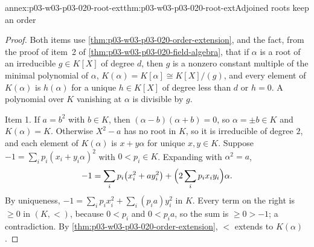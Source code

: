 \begin{annexitem}{annex:p03-w03-p03-020-root-ext}{thm:p03-w03-p03-020-root-ext}{Adjoined roots keep an order}
\begin{proof}
Both items use \cref{thm:p03-w03-p03-020-order-extension}, and the fact,
from the proof of item~2 of \cref{thm:p03-w03-p03-020-field-algebra}, that
if \(\alpha\) is a root of an irreducible \(g\in K[X]\) of degree \(d\),
then \(g\) is a nonzero constant multiple of the minimal polynomial of
\(\alpha\), \(K(\alpha)=K[\alpha]\cong K[X]/(g)\), and every element of
\(K(\alpha)\) is \(h(\alpha)\) for a unique \(h\in K[X]\) of degree less than
\(d\) or \(h=0\). A polynomial over \(K\) vanishing at \(\alpha\) is
divisible by \(g\).

Item 1. If \(a=b^2\) with \(b\in K\), then \((\alpha-b)(\alpha+b)=0\), so
\(\alpha=\pm b\in K\) and \(K(\alpha)=K\). Otherwise \(X^2-a\) has no root
in \(K\), so it is irreducible of degree \(2\), and each element of
\(K(\alpha)\) is \(x+y\alpha\) for unique \(x,y\in K\). Suppose
\(-1=\sum_ip_i(x_i+y_i\alpha)^2\) with \(0<p_i\in K\). Expanding with
\(\alpha^2=a\),
\[
-1=\sum_ip_i\bigl(x_i^2+ay_i^2\bigr)+\Bigl(2\sum_ip_ix_iy_i\Bigr)\alpha .
\]
By uniqueness, \(-1=\sum_ip_ix_i^2+\sum_i(p_ia)y_i^2\) in \(K\). Every term
on the right is \(\ge0\) in \((K,<)\), because \(0<p_i\) and \(0<p_ia\), so
the sum is \(\ge0>-1\); a contradiction. By
\cref{thm:p03-w03-p03-020-order-extension}, \(<\) extends to
\(K(\alpha)\).


\end{proof}
\end{annexitem}
